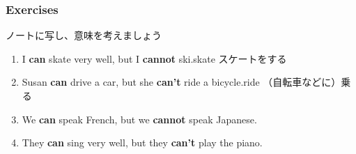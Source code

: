 \documentclass[aspectratio=169,xcolor={dvipsnames,table}]{beamer}
\newcommand{\myaudio}[1]{\href{#1}{\faVolumeUp}}
\begin{document}
\begin{frame}[plain]\frametitle{Exercises}
 ノートに写し、意味を考えましょう

\begin{enumerate}
 \item I {\bfseries can} skate very well, but I {\bfseries cannot} ski.\hfill{\scriptsize skate  スケートをする}
 \item Susan {\bfseries can} drive a car, but she {\bfseries can't} ride a bicycle.\hfill{\scriptsize ride  （自転車などに）乗る}
 \item We {\bfseries can} speak French, but we {\bfseries cannot} speak Japanese.
 \item They {\bfseries can} sing very well, but they {\bfseries can't} play the piano.
\end{enumerate}
\vfill


\hfill{}

\mbox{}\hfill{\myaudio{./audio/012_can_05.mp3}}
\end{frame}
\end{document}
